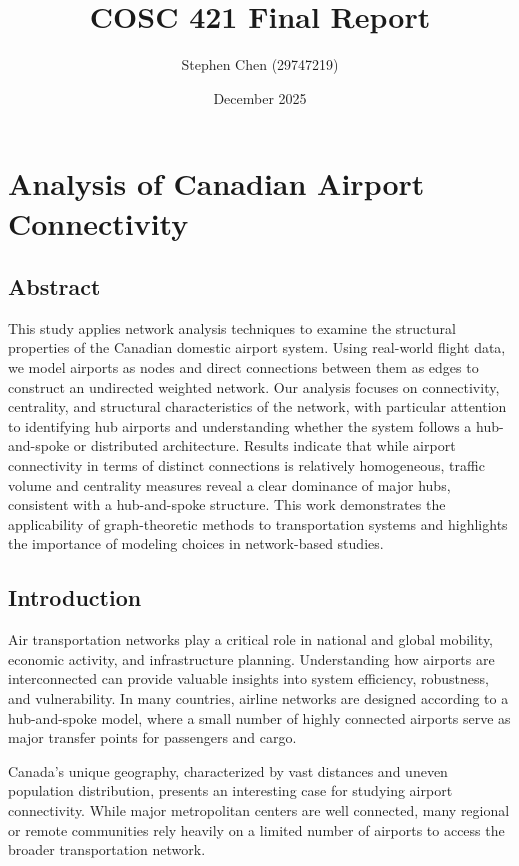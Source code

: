 \documentclass{article}
\title{COSC 421 Final Report}
\author{Stephen Chen (29747219)}
\date{December 2025}
\begin{document}
\maketitle

\section{Analysis of Canadian Airport Connectivity}

\subsection{Abstract}
This study applies network analysis techniques to examine the structural properties of the Canadian domestic airport system. Using real-world flight data, we model airports as nodes and direct connections between them as edges to construct an undirected weighted network. Our analysis focuses on connectivity, centrality, and structural characteristics of the network, with particular attention to identifying hub airports and understanding whether the system follows a hub-and-spoke or distributed architecture. Results indicate that while airport connectivity in terms of distinct connections is relatively homogeneous, traffic volume and centrality measures reveal a clear dominance of major hubs, consistent with a hub-and-spoke structure. This work demonstrates the applicability of graph-theoretic methods to transportation systems and highlights the importance of modeling choices in network-based studies.

\subsection{Introduction}
Air transportation networks play a critical role in national and global mobility, economic activity, and infrastructure planning. Understanding how airports are interconnected can provide valuable insights into system efficiency, robustness, and vulnerability. In many countries, airline networks are designed according to a hub-and-spoke model, where a small number of highly connected airports serve as major transfer points for passengers and cargo.

Canada’s unique geography, characterized by vast distances and uneven population distribution, presents an interesting case for studying airport connectivity. While major metropolitan centers are well connected, many regional or remote communities rely heavily on a limited number of airports to access the broader transportation network.
\end{document}
